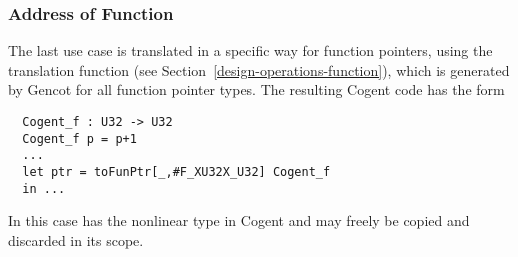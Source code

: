 \subsubsection{Address of Function}

The last use case is translated in a specific way for function pointers, using the translation function
 (see Section~\ref{design-operations-function}), which is generated by Gencot for all function
pointer types. The resulting Cogent code has the form
\begin{verbatim}
  Cogent_f : U32 -> U32
  Cogent_f p = p+1
  ...
  let ptr = toFunPtr[_,#F_XU32X_U32] Cogent_f
  in ...
\end{verbatim}
In this case  has the nonlinear type  in Cogent and may freely be copied and
discarded in its scope.

